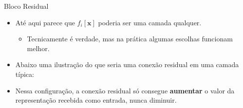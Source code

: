 \documentclass[aspectratio=169,xcolor=dvipsnames]{beamer}
\begin{document}
\begin{frame}{Bloco Residual}
\begin{itemize}
    \item Até aqui parece que $f_i[\mathbf{x}]$ poderia ser uma camada qualquer.
    \begin{itemize}
        \item Tecnicamente é verdade, mas na prática algumas escolhas funcionam melhor.
    \end{itemize}
    \item Abaixo uma ilustração do que seria uma conexão residual em uma camada típica:
\end{itemize}
\vspace{0.6em}
\begin{center}
\end{center}
\vspace{0.6em}
\begin{itemize}
    \item Nessa configuração, a conexão residual só consegue \textbf{aumentar} o valor da representação recebida como entrada, nunca diminuir.
\end{itemize}
\end{frame}
\end{document}
